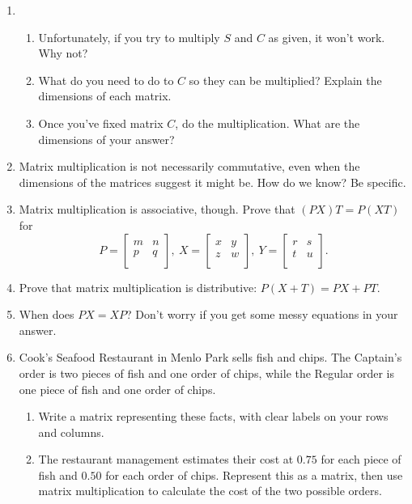 \documentclass[../gatm.tex]{subfiles}
\begin{document}
\begin{enumerate}
\setcounter{enumi}{\value{mtrx_mult_problem_i}}
\item \begin{enumerate}
\item Unfortunately, if you try to multiply $S$ and $C$ as given, it won't work. Why not?
\item What do you need to do to $C$ so they can be multiplied? Explain the dimensions of each matrix.
\item Once you've fixed matrix $C$, do the multiplication. What are the dimensions of your answer?
\end{enumerate}
\item Matrix multiplication is not necessarily commutative, even when the dimensions of the matrices suggest it might be. How do we know? Be specific.
\item Matrix multiplication is associative, though. Prove that $(PX)T=P(XT)$ for $$P=\left[\begin{array}{cc} m & n \\ p & q \\ \end{array}\right],\: X=\left[\begin{array}{cc} x & y \\ z & w \\ \end{array}\right],\: Y=\left[\begin{array}{cc} r & s \\ t & u \\ \end{array}\right].$$
\item Prove that matrix multiplication is distributive: $P(X+T)=PX+PT$.
\item When does $PX=XP$? Don't worry if you get some messy equations in your answer.
\item Cook's Seafood Restaurant in Menlo Park sells fish and chips. The Captain's order is two pieces of fish and one order of chips, while the Regular order is one piece of fish and one order of chips.
\begin{enumerate}
\item Write a matrix representing these facts, with clear labels on your rows and columns.
\item The restaurant management estimates their cost at $0.75$ for each piece of fish and $0.50$ for each order of chips. Represent this as a matrix, then use matrix multiplication to calculate the cost of the two possible orders.

\end{enumerate}
\end{enumerate}
\end{document}
